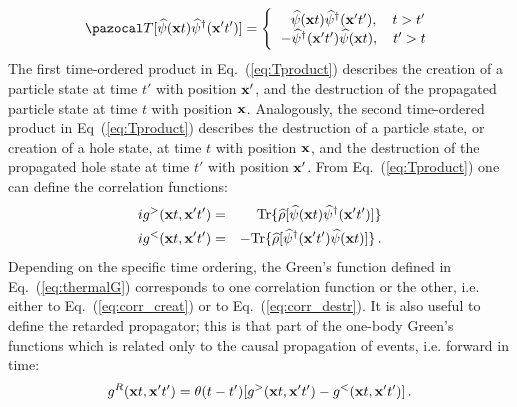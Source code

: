 \begin{equation}
\label{eq:Tproduct}
{\pazocal T}[\widehat\psi({\bf x}t) \widehat\psi^\dagger({\bf x'}t')]=
 \Bigg\{
  \begin{tabular}{c}
  \,\,\,\,$\widehat\psi({\bf x}t) \widehat\psi^\dagger({\bf x'}t'), \quad t>t'$  \\
  $-\widehat\psi^\dagger({\bf x'}t') \widehat\psi({\bf x}t), \quad t'>t$
  \end{tabular}
\end{equation}
The first time-ordered product in Eq.~(\ref{eq:Tproduct}) describes the creation of a particle state at time $t'$ with position ${\bf x'}$, and the destruction of the propagated particle state at time $t$ with position ${\bf x}$. Analogously, the second time-ordered product in Eq~(\ref{eq:Tproduct}) describes the destruction of a particle state, or creation of a hole state, at time $t$ with position ${\bf x}$, and the destruction of the propagated hole state at time $t'$ with position ${\bf x'}$. From Eq.~(\ref{eq:Tproduct}) one can define the correlation functions: 
\begin{eqnarray}
\label{eq:corr_creat}
ig^>({\bf x}t, {\bf x'}t')&=& ~ ~ {\rm Tr}\{\widehat{\rho}[\widehat\psi({\bf x}t) \widehat\psi^\dagger({\bf x'}t')]\} \\
ig^<({\bf x}t, {\bf x'}t')&=& -{\rm Tr}\{\widehat{\rho}[\widehat\psi^\dagger({\bf x'}t')\widehat\psi({\bf x}t)]\}\,.
\label{eq:corr_destr}
\end{eqnarray}
Depending on the specific time ordering, the Green's function defined in Eq.~(\ref{eq:thermalG}) corresponds to one correlation function or the other, i.e. either to Eq.~(\ref{eq:corr_creat}) or to Eq.~(\ref{eq:corr_destr}). It is also useful to define the retarded propagator; this is that part of the one-body Green's functions which is related only to the causal  propagation of events, i.e. forward in time:
\begin{equation}
\label{eq:retar_prop}
g^R({\bf x}t, {\bf x'}t')=\theta(t-t')[g^>({\bf x}t, {\bf x'}t')-g^<({\bf x}t, {\bf x'}t')]\,.
\end{equation}

